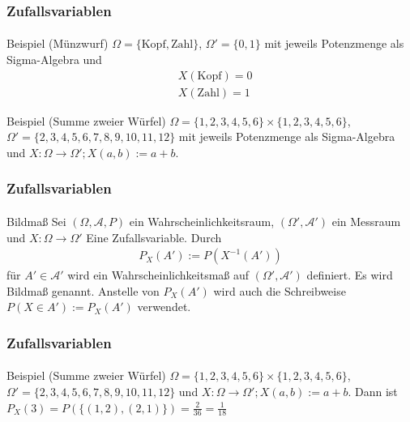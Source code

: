 \documentclass{beamer}
\begin{document}
\begin{frame}
    \frametitle{Zufallsvariablen}
\framesubtitle{}
\begin{block}{Beispiel (Münzwurf)}
$\Omega = \{\text{Kopf}, \text{Zahl} \} $, $\Omega' = \{ 0,1 \}$  mit jeweils Potenzmenge als Sigma-Algebra und 
\begin{align*}
& X (\text{Kopf} ) = 0 \\
& X (\text{Zahl} ) = 1 
\end{align*}
\end{block}

\begin{block}{Beispiel (Summe zweier Würfel)}
$\Omega = \{1,2,3,4,5,6 \} \times \{1,2,3,4,5,6 \} $, $\Omega' = \{ 2,3,4,5,6,7,8,9,10, 11, 12\}$   mit jeweils Potenzmenge als Sigma-Algebra und $X: \Omega \to \Omega'; X (a,b) := a +b$. 
\end{block}

 \end{frame}

\begin{frame}
    \frametitle{Zufallsvariablen}
\framesubtitle{}
\begin{block}{Bildmaß}
Sei $(\Omega, \mathcal{A}, P)$ ein Wahrscheinlichkeitsraum, $(\Omega', \mathcal{A}')$ ein Messraum und  $X : \Omega \to \Omega'$  Eine Zufallsvariable. 
Durch 
\begin{align*}
P_X (A') := P(X^{-1} (A'))
\end{align*}
 für $A' \in \mathcal{A}'$ wird ein Wahrscheinlichkeitsmaß auf  $(\Omega', \mathcal{A}')$ definiert. Es wird Bildmaß genannt. Anstelle von $P_X (A')$ wird auch die Schreibweise $P (X \in A'):= P_X (A')$ verwendet.
\end{block}


 \end{frame}

\begin{frame}
    \frametitle{Zufallsvariablen}
\framesubtitle{}

\begin{block}{Beispiel (Summe zweier Würfel)}
$\Omega = \{1,2,3,4,5,6 \} \times \{1,2,3,4,5,6 \} $, $\Omega' = \{ 2,3,4,5,6,7,8,9,10, 11, 12\}$ und $X: \Omega \to \Omega'; X (a,b) := a +b$. Dann ist 
$P_X(3) = P(\{(1,2), (2,1)\}) = \frac{2}{36} = \frac{1}{18}$ 
\end{block}

 \end{frame}
\end{document}
